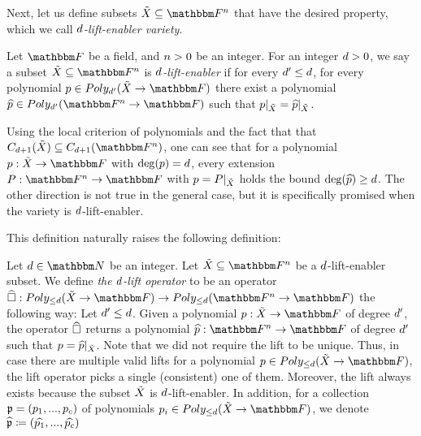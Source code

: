 Next, let us define subsets $\variety \subseteq \field$ that have the desired property, which we call \emph{$d$-lift-enabler variety}.
\begin{definition}
    Let $\basefield$ be a field, and $n>0$ be an integer.
    For an integer $d > 0$, we say a subset $\variety\subseteq\field$ is \emph{$d$-lift-enabler} if for every $d^{\prime} \leq d$,
    for every polynomial $\onvarpoly \in \allpolyset{\degree^{\prime}}{\variety}{\basefield}$
    there exist a polynomial $\lift{\onvarpoly} \in \allpolyset{\degree^{\prime}}{\field}{\basefield}$ such that $\restrictfunc{\onvarpoly}{\variety}=\restrictfunc{\lift{\onvarpoly}}{\variety}$.
\end{definition}
\begin{remark}
    Using the local criterion of polynomials and the fact that that $\cubes{\degree+1}{\variety} \subseteq \cubes{\degree+1}{\field}$,
    one can see that for a polynomial $\funcdef{\onvarpoly}{\variety}{\basefield}$ with $\deg(\onvarpoly) = \degree$,
    every extension $\funcdef{\genpoly}{\field}{\basefield}$ with $\onvarpoly = \restrictfunc{\genpoly}{\variety}$
    holds the bound $\deg(\lift{\onvarpoly}) \geq \degree$.
    The other direction is not true in the general case, but it is specifically promised when the variety is $d$-lift-enabler.
\end{remark}

This definition naturally raises the following definition:
\begin{definition}
    Let $\degree \in \naturalnumbersset$ be an integer.
    Let $\variety \subseteq \field$ be a $d$-lift-enabler subset.
    We define \emph{the $d$-lift operator} to be an operator $\funcdef{\lift{\square}}{\allpolyset{\leq \degree}{\variety}{\basefield}}{\allpolyset{\leq \degree}{\field}{\basefield}}$ the following way:
    \newline
    Let $d^\prime \leq d$.
    Given a polynomial $\funcdef{\onvarpoly}{\variety}{\basefield}$ of degree $d^\prime$, the operator $\widehat{\square}$ returns a polynomial $\funcdef{\lift{\onvarpoly}}{\field}{\basefield}$ of degree $d^\prime$
    such that $\onvarpoly = \restrictfunc{\lift{\onvarpoly}}{\variety}$.
    Note that we did not require the lift to be unique.
    Thus, in case there are multiple valid lifts for a polynomial $\onvarpoly \in \allpolyset{\leq \degree}{\variety}{\basefield}$, the lift operator picks a single (consistent) one of them.
    Moreover, the lift always exists because the subset ${\tilde{X}}$ is $d$-lift-enabler.
    \newline
    In addition, for a collection $\onvarpolyset = (\onvarpoly_1,...,\onvarpoly_c)$ of polynomials $\onvarpoly_i \in \allpolyset{\leq \degree}{\variety}{\basefield}$,
    we denote $\lift{\onvarpolyset} \definedas (\lift{\onvarpoly_1},...,\lift{\onvarpoly_c})$
\end{definition}

